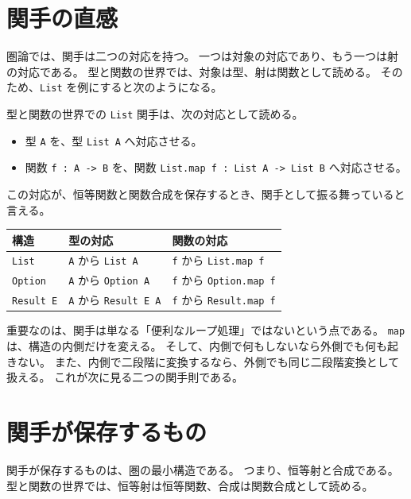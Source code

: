 \section{関手の直感}

圏論では、関手は二つの対応を持つ。
一つは対象の対応であり、もう一つは射の対応である。
型と関数の世界では、対象は型、射は関数として読める。
そのため、\texttt{List} を例にすると次のようになる。

\begin{definitionbox}
型と関数の世界での \texttt{List} 関手は、次の対応として読める。
\begin{itemize}
\item 型 \texttt{A} を、型 \texttt{List A} へ対応させる。
\item 関数 \texttt{f : A -> B} を、関数 \texttt{List.map f : List A -> List B} へ対応させる。
\end{itemize}
この対応が、恒等関数と関数合成を保存するとき、関手として振る舞っていると言える。
\end{definitionbox}

\begin{center}
\begin{tabular}{lll}
\toprule
構造 & 型の対応 & 関数の対応 \\
\midrule
\texttt{List} & \texttt{A} から \texttt{List A} & \texttt{f} から \texttt{List.map f} \\
\texttt{Option} & \texttt{A} から \texttt{Option A} & \texttt{f} から \texttt{Option.map f} \\
\texttt{Result E} & \texttt{A} から \texttt{Result E A} & \texttt{f} から \texttt{Result.map f} \\
\bottomrule
\end{tabular}
\end{center}


重要なのは、関手は単なる「便利なループ処理」ではないという点である。
\texttt{map} は、構造の内側だけを変える。
そして、内側で何もしないなら外側でも何も起きない。
また、内側で二段階に変換するなら、外側でも同じ二段階変換として扱える。
これが次に見る二つの関手則である。

\section{関手が保存するもの}

関手が保存するものは、圏の最小構造である。
つまり、恒等射と合成である。
型と関数の世界では、恒等射は恒等関数、合成は関数合成として読める。

